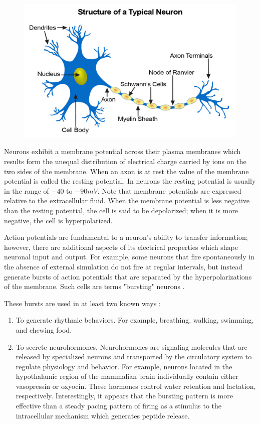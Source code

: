 \documentclass[12]{book}
\newcommand\0{\mathbf{0}}
\newcommand\<{\langle}
\renewcommand\>{\rangle}
\begin{document}
\begin{figure}[h]
\centering
\includegraphics{neuron-structure.jpg}
\end{figure}


Neurons exhibit a membrane potential across their plasma membranes which results form the unequal distribution of electrical charge carried by ions on the two sides of the membrane. When an axon is at rest the value of the membrane potential is called the resting potential. In neurons the resting potential is usually in the range of $-40$ to $-90 mV$. Note that membrane potentials are expressed relative to the extracellular fluid. When the membrane potential is less negative than the resting potential, the cell is said to be depolarized; when it is more negative, the cell is hyperpolarized.

Action potentials are fundamental to a neuron's ability to transfer information; however, there are additional aspects of its electrical properties which shape neuronal input and output. For example, some neurons that fire spontaneously in the absence of external simulation do not fire at regular intervals, but instead generate bursts of action potentials that are separated by the hyperpolarizations of the membrane. Such cells are terms "bursting" neurons \cite{levitan2015neuron}.

These bursts are used in at least two known ways \cite{levitan2015neuron}:

\begin{enumerate}
\item To generate rhythmic behaviors. For example, breathing, walking, swimming, and chewing food.	
\item To secrete neurohormones. Neurohormones are signaling molecules that are released by specialized neurons and transported by the circulatory system to regulate physiology and behavior. For example, neurons located in the hypothalamic region of the mammalian brain individually contain either vasopressin or oxyocin. These hormones control water retention and lactation, respectively. Interestingly, it appears that the bursting pattern is more effective than a steady pacing pattern of firing as a stimulus to the intracellular mechanism which generates peptide release.
\end{enumerate}
\end{document}
